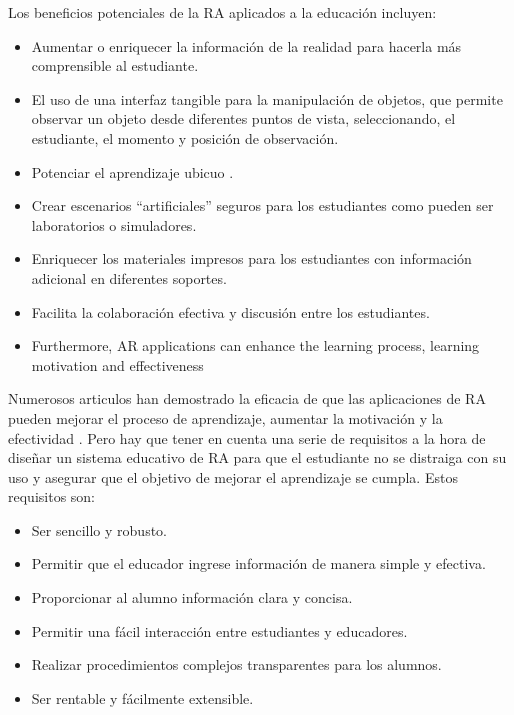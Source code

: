 Los beneficios potenciales de la RA aplicados a la educación incluyen:
\begin{itemize}

    \item Aumentar o enriquecer la información de la realidad para hacerla más comprensible al estudiante.
    

    \item El uso de una interfaz tangible para la manipulación de objetos, que permite observar un objeto desde diferentes puntos de vista,
    seleccionando, el estudiante, el momento y posición de observación.

    \item Potenciar el aprendizaje ubicuo \cite{URL::AprendizajeUbicuo}.
    
    \item Crear escenarios “artificiales” seguros para los estudiantes
    como pueden ser laboratorios o simuladores. 

    \item Enriquecer los materiales impresos para los estudiantes con información adicional en diferentes soportes.
    
    \item Facilita la colaboración efectiva y discusión entre los estudiantes.
    \item 
    Furthermore, AR applications can enhance the learning process, learning motivation and effectiveness
\end{itemize}

Numerosos articulos han demostrado la eficacia de que las aplicaciones de RA pueden mejorar el proceso de aprendizaje, aumentar la motivación y la efectividad \cite{URL::animationeco} \cite{URL::ar2}. Pero hay que tener en cuenta una serie de requisitos a la hora de diseñar un sistema educativo de RA para que el estudiante no se distraiga con su uso y asegurar que el objetivo de mejorar el aprendizaje se cumpla. Estos requisitos son:

\begin{itemize}
    \item Ser sencillo y robusto.
    \item Permitir que el educador ingrese información de manera simple y efectiva.
    \item Proporcionar al alumno información clara y concisa.
    \item Permitir una fácil interacción entre estudiantes y educadores.
    \item Realizar procedimientos complejos transparentes para los alumnos.
    \item Ser rentable y fácilmente extensible.
\end{itemize}


